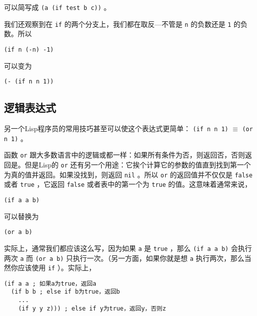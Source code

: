 可以简写成 \texttt{(a (if test b c))} 。

我们还观察到在 \texttt{if} 的两个分支上，我们都在取反---不管是 \texttt{n} 的负数还是 \texttt{1} 的负数。所以

\begin{verbatim}
(if n (-n) -1)
\end{verbatim}

可以变为

\begin{verbatim}
(- (if n n 1))
\end{verbatim}

\subsection{逻辑表达式}
\label{section:02-Logical-Expressions}

另一个Lisp程序员的常用技巧甚至可以使这个表达式更简单： \texttt{(if n n 1)} $\equiv$ \texttt{(or n 1)} 。

函数 \texttt{or} 跟大多数语言中的逻辑或都一样：如果所有条件为否，则返回否，否则返回是。但是Lisp的 \texttt{or} 还有另一个用途：它挨个计算它的参数的值直到找到第一个为真的值并返回。如果没找到，则返回 \texttt{nil} 。所以 \texttt{or} 的返回值并不仅仅是 \texttt{false} 或者 \texttt{true} ，它返回 \texttt{false} 或者表中的第一个为 \texttt{true} 的值。这意味着通常来说，

\begin{verbatim}
(if a a b)
\end{verbatim}

可以替换为

\begin{verbatim}
(or a b)
\end{verbatim}

实际上，通常我们都应该这么写，因为如果 \texttt{a} 是 \texttt{true} ，那么 \texttt{(if a a b)} 会执行两次 \texttt{a} 而 \texttt{(or a b)} 只执行一次。（另一方面，如果你就是想 \texttt{a} 执行两次，那么当然你应该使用 \texttt{if} ）。实际上，

\begin{verbatim}
(if a a ; 如果a为true，返回a
  (if b b ; else if b为true，返回b
    ...
    (if y y z))) ; else if y为true，返回y，否则z
\end{verbatim}

